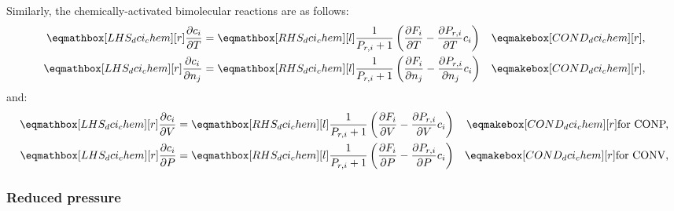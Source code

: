 \documentclass[12pt]{article}
\newcommand{\conp}{CONP}
\newcommand{\conv}{CONV}
\newcommand{\dconp}{\ifmmode\text{for \conp,}\else for \conp,\fi}
\newcommand{\dconv}{\ifmmode\text{for \conv,}\else for \conv.\fi}
\begin{document}
Similarly, the chemically-activated bimolecular reactions are as follows:
\begin{align}
 \label{e:dci_chem_dt}
 \lhs{dci_chem}{\frac{\partial c_i }{\partial T }} &= \rhs{dci_chem}{\frac{1}{P_{r, i} + 1} \left(\frac{\partial F_{i} }{\partial T } - \frac{\partial P_{r, i} }{\partial T } c_{i}\right)} & \cond{dci_chem}{,} \\
 \label{e:dci_chem_dnj}
 \lhs{dci_chem}{\frac{\partial c_i }{\partial n_j }} &= \rhs{dci_chem}{\frac{1}{P_{r, i} + 1} \left(\frac{\partial F_{i} }{\partial n_j } - \frac{\partial P_{r, i} }{\partial n_j } c_{i}\right)} & \cond{dci_chem}{,}
\end{align}
and:
\begin{subequations}
 \label{e:dci_chem_de}
 \begin{align}
  \lhs{dci_chem}{\frac{\partial c_i }{\partial V }} &= \rhs{dci_chem}{\frac{1}{P_{r, i} + 1} \left(\frac{\partial F_{i} }{\partial V } - \frac{\partial P_{r, i} }{\partial V } c_{i}\right)} & \cond{dci_chem}{\dconp} \\
  \lhs{dci_chem}{\frac{\partial c_i }{\partial P }} &= \rhs{dci_chem}{\frac{1}{P_{r, i} + 1} \left(\frac{\partial F_{i} }{\partial P } - \frac{\partial P_{r, i} }{\partial P } c_{i}\right)} & \cond{dci_chem}{\dconv}
 \end{align}
\end{subequations}

\subsubsection{Reduced pressure}
\label{s:dpr}
\end{document}
